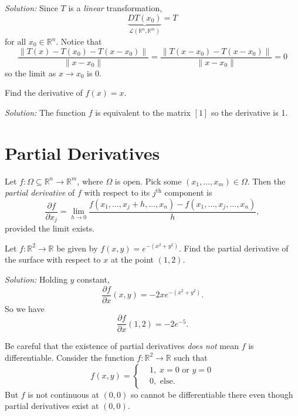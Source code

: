\documentclass[11pt]{article}
\theoremstyle{definition}
\newcommand{\R}{\mathbb{R}}                      %
\begin{document}
\textit{Solution:} Since $T$ is a \textit{linear} transformation,
$$
\underbrace{DT(x_0)}_{\mathcal{L}(\R^n,\R^m)}=T
$$
for all $x_0\in\R^n$. Notice that
$$
\frac{\|T(x)-T(x_0)-T(x-x_0)\|}{\|x-x_0\|}=\frac{\|T(x-x_0)-T(x-x_0)\|}{\|x-x_0\|}=0
$$
so the limit as $x\to x_0$ is 0.

\ex Find the derivative of $f(x)=x$.

\textit{Solution:} The function $f$ is equivalent to the matrix $[1]$ so the derivative is 1.

\section{Partial Derivatives}
\begin{mdframed}[backgroundcolor = blue!10]
\vspace{+0.2cm}
Let $f:\Omega\subseteq \R^n\to\R^m$, where $\Omega$ is open. Pick some $(x_1,\dots,x_m)\in\Omega$. Then the \textit{partial derivative} of $f$ with respect to its $j^\mathrm{th}$ component is 
$$
\frac{\partial f}{\partial x_j}=\lim_{h\to 0} \frac{f(x_1,\dots,x_j+h,\dots,x_n)-f(x_1,\dots,x_j,\dots,x_n)}{h},
$$
provided the limit exists.
\end{mdframed}

\ex Let $f:\R^2\to \R$ be given by $f(x,y)=e^{-(x^2+y^2)}$. Find the partial derivative of the surface with respect to $x$ at the point $(1,2)$.

\textit{Solution:} Holding $y$ constant,
$$
\frac{\partial f}{\partial x}(x,y)=-2xe^{-(x^2+y^2)}.
$$
So we have
$$
\frac{\partial f}{\partial x}(1,2)=-2e^{-5}.
$$

\ex Be careful that the existence of partial derivatives \textit{does not} mean $f$ is differentiable. Consider the function $f:\R^2\to\R$ such that
$$
f(x,y)=\left\{ 
\begin{aligned}
&1, \;x=0\mbox{ or }y=0\\
&0, \mbox{ else}.
\end{aligned}
\right.
$$
But $f$ is not continuous at $(0,0)$ so cannot be differentiable there even though partial derivatives exist at $(0,0)$.
\end{document}
